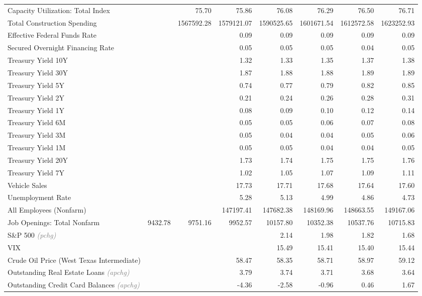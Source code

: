\documentclass[11pt, letterpaper]{article}\usepackage[]{graphicx}\usepackage[]{color}
\begin{document}
\begin{table}[H]
\begin{tabular}{lrrrrrrr}
  Capacity Utilization: Total Index &  & 75.70 & 75.86 & 76.08 & 76.29 & 76.50 & 76.71 \\ 
  Total Construction Spending &  & 1567592.28 & 1579121.07 & 1590525.65 & 1601671.54 & 1612572.58 & 1623252.93 \\ 
  Effective Federal Funds Rate &  &  & 0.09 & 0.09 & 0.09 & 0.09 & 0.09 \\ 
  Secured Overnight Financing Rate &  &  & 0.05 & 0.05 & 0.05 & 0.04 & 0.05 \\ 
  Treasury Yield 10Y &  &  & 1.32 & 1.33 & 1.35 & 1.37 & 1.38 \\ 
  Treasury Yield 30Y &  &  & 1.87 & 1.88 & 1.88 & 1.89 & 1.89 \\ 
  Treasury Yield 5Y &  &  & 0.74 & 0.77 & 0.79 & 0.82 & 0.85 \\ 
  Treasury Yield 2Y &  &  & 0.21 & 0.24 & 0.26 & 0.28 & 0.31 \\ 
  Treasury Yield 1Y &  &  & 0.08 & 0.09 & 0.10 & 0.12 & 0.14 \\ 
  Treasury Yield 6M &  &  & 0.05 & 0.05 & 0.06 & 0.07 & 0.08 \\ 
  Treasury Yield 3M &  &  & 0.05 & 0.04 & 0.04 & 0.05 & 0.06 \\ 
  Treasury Yield 1M &  &  & 0.05 & 0.05 & 0.04 & 0.04 & 0.05 \\ 
  Treasury Yield 20Y &  &  & 1.73 & 1.74 & 1.75 & 1.75 & 1.76 \\ 
  Treasury Yield 7Y &  &  & 1.02 & 1.05 & 1.07 & 1.09 & 1.11 \\ 
  Vehicle Sales &  &  & 17.73 & 17.71 & 17.68 & 17.64 & 17.60 \\ 
  Unemployment Rate &  &  & 5.28 & 5.13 & 4.99 & 4.86 & 4.73 \\ 
  All Employees (Nonfarm) &  &  & 147197.41 & 147682.38 & 148169.96 & 148663.55 & 149167.06 \\ 
  Job Openings: Total Nonfarm & 9432.78 & 9751.16 & 9952.57 & 10157.80 & 10352.38 & 10537.76 & 10715.83 \\ 
  S\&P 500 \textit{\footnotesize\textcolor{gray}{(pchg)}} &  &  &  & 2.14 & 1.98 & 1.82 & 1.68 \\ 
  VIX &  &  &  & 15.49 & 15.41 & 15.40 & 15.44 \\ 
  Crude Oil Price (West Texas Intermediate) &  &  & 58.47 & 58.35 & 58.71 & 58.97 & 59.12 \\ 
  Outstanding Real Estate Loans \textit{\footnotesize\textcolor{gray}{(apchg)}} &  &  & 3.79 & 3.74 & 3.71 & 3.68 & 3.64 \\ 
  Outstanding Credit Card Balances \textit{\footnotesize\textcolor{gray}{(apchg)}} &  &  & -4.36 & -2.58 & -0.96 & 0.46 & 1.67 \\ 

\end{tabular}
\end{table}
\end{document}
